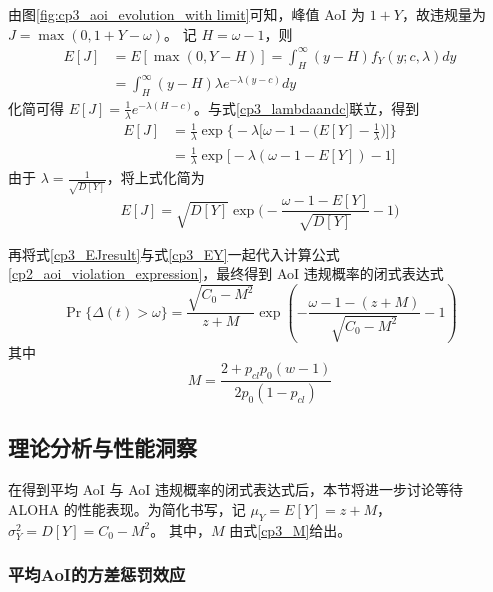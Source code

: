 由图\ref{fig:cp3_aoi_evolution_with limit}可知，峰值 AoI 为 $1+Y$，故违规量为 $J=\max(0,1+Y-\omega)$。
记 $H=\omega-1$，则
\begin{equation}\label{cp3_EJ}
\begin{aligned}
    E[J] &= E[\max(0, Y - H)] = \int_{H}^{\infty} (y - H) f_Y(y; c, \lambda) dy \\
    &= \int_{H}^{\infty} (y-H)\lambda e^{-\lambda(y-c)}dy
\end{aligned}
\end{equation}
化简可得 $E[J]  = \frac{1}{\lambda} e^{-\lambda(H-c)}$。与式\eqref{cp3_lambdaandc}联立，得到
\begin{equation}\label{cp3_EJresult_expand}
\begin{aligned}
E[J] &= \frac{1}{\lambda} \exp\Big\{ -\lambda \big[ \omega - 1 - \big( E[Y] - \frac{1}{\lambda} \big) \big] \Big\} \\
&= \frac{1}{\lambda} \exp\big[ -\lambda(\omega - 1 - E[Y]) - 1 \big]
\end{aligned}
\end{equation}
由于 $\lambda=\frac{1}{\sqrt{D[Y]}}$，将上式化简为
\begin{equation}\label{cp3_EJresult}
E[J] = \sqrt{D[Y]} \exp\Bigg( -\frac{\omega - 1 - E[Y]}{\sqrt{D[Y]}} - 1 \Bigg)
\end{equation}

再将式\eqref{cp3_EJresult}与式\eqref{cp3_EY}一起代入计算公式\eqref{cp2_aoi_violation_expression}，最终得到 AoI 违规概率的闭式表达式
\begin{equation}\label{cp3_violation_prob_simplified}
    \Pr\{\Delta(t) > \omega\} = \frac{\sqrt{C_0 - M^2}}{z + M} \exp\left( -\frac{\omega - 1 - (z + M)}{\sqrt{C_0 - M^2}} - 1 \right)
\end{equation}
其中
\begin{equation}\label{cp3_M}
    M = \frac{2 + p_{cl} p_0 (w-1)}{2 p_0 (1-p_{cl})}
\end{equation}

\subsection{理论分析与性能洞察}

在得到平均 AoI 与 AoI 违规概率的闭式表达式后，本节将进一步讨论等待 ALOHA 的性能表现。为简化书写，记 $\mu_Y = E[Y] = z + M$，$\sigma_Y^2 = D[Y] = C_0 - M^2$。
其中，$M$ 由式\eqref{cp3_M}给出。

\subsubsection{平均AoI的方差惩罚效应}

